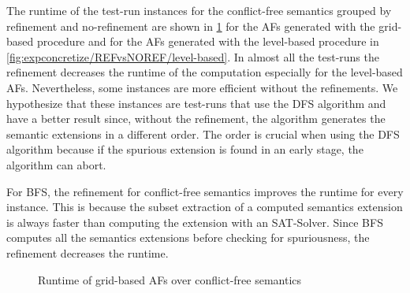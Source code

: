 The runtime of the test-run instances for the conflict-free semantics grouped by refinement and no-refinement are shown in \cref{fig:expconcretize/REFvsNOREF/grid-based} for the AFs generated with the grid-based procedure and for the AFs generated with the level-based procedure in \cref{fig:expconcretize/REFvsNOREF/level-based}. In almost all the test-runs the refinement decreases the runtime of the computation especially for the level-based AFs. Nevertheless, some instances are more efficient without the refinements. We hypothesize that these instances are test-runs that use the DFS algorithm and have a better result since, without the refinement, the algorithm generates the semantic extensions in a different order. The order is crucial when using the DFS algorithm because if the spurious extension is found in an early stage, the algorithm can abort.

For BFS, the refinement for conflict-free semantics improves the runtime for every instance. This is because the subset extraction of a computed semantics extension is always faster than computing the extension with an SAT-Solver. Since BFS computes all the semantics extensions before checking for spuriousness, the refinement decreases the runtime.

\begin{figure}[H]
    \centering
    \caption{Runtime of grid-based AFs over conflict-free semantics}
    \label{fig:expconcretize/REFvsNOREF/grid-based}
\end{figure}


